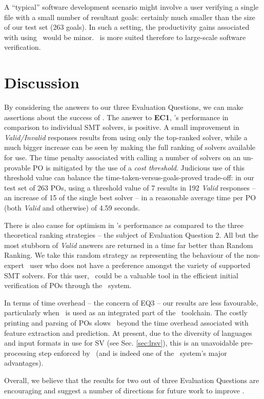 A ``typical'' software development scenario might involve a user verifying a single file with a small number of resultant goals: certainly much smaller than the size of our test set (263 goals). In such a setting, the productivity gains associated with using \where~would be minor. 
\where~is more suited therefore to large-scale software verification.


\section{Discussion}
\label{sec:eval-discuss}

By considering the answers to our three Evaluation Questions, we can make assertions about the success of  \where.
The answer to \textbf{EC1}, \where's performance in comparison to individual SMT solvers, is positive.
A small improvement in \textit{Valid/Invalid} responses results from using only the top-ranked solver, while a much bigger increase can be seen by making the full ranking of solvers available for use.
The time penalty associated with calling a number of solvers on an un-provable PO is mitigated by the use of a \textit{cost threshold}.
Judicious use of this threshold value can balance the time-taken-versus-goals-proved trade-off: in our test set of 263 POs, using a threshold value of 7 results in 192 \textit{Valid} responses -- an increase of 15 of the single best solver -- in a reasonable average time per PO (both \textit{Valid} and otherwise) of 4.59 seconds.

There is also cause for optimism in \where's performance as compared to the three theoretical ranking strategies -- the subject of Evaluation Question 2. 
All but the most stubborn of \textit{Valid} answers are returned in a time far better than \textsf{Random Ranking}.
We take this random strategy as representing the behaviour of the non-expert \why~user who does not have a preference amongst the variety of supported SMT solvers.
For this user, \where~could be a valuable tool in the efficient initial verification of POs through the \why~system.    

In terms of time overhead -- the concern of EQ3 -- our results are less favourable, particularly when \where~is used as an integrated part of the \why~toolchain.
The costly printing and parsing of POs slows \where~beyond the time overhead associated with feature extraction and prediction.
At present, due to the diversity of languages and input formats in use for SV (see Sec. \ref{sec:lrsv}), this is an unavoidable pre-processing step enforced by \why~(and is indeed one of the \why~system's major advantages).

Overall, we believe that the results for two out of three Evaluation Questions are encouraging and suggest a number of directions for future work to improve \where.
 

 

